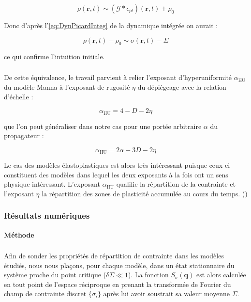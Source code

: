 \begin{equation}
	\rho (\mathbf{r},t) \sim \left(\mathcal{G}\ast\epsilon_{pl}\right)(\mathbf{r},t)+ \rho_0
\end{equation}

\noindent Donc d'après l'\autoref{eq:DynPicardInteg} de la dynamique intégrée on aurait :

\begin{equation}
	\rho (\mathbf{r},t) - \rho_0 \sim \sigma (\mathbf{r},t)- \Sigma
\end{equation}

\noindent ce qui confirme l'intuition initiale.

\subparagraph{}De cette équivalence, le travail \cite{wiese_hyperuniformity_2024} parvient à relier l'exposant d'hyperuniformité $\alpha_\text{HU}$ du modèle Manna à l'exposant de rugosité $\eta$ du dépiégeage avec la relation d'échelle :

\begin{equation}
	\alpha_\text{HU} = 4 - D - 2\eta
\end{equation}

\noindent que l'on peut généraliser dans notre cas pour une portée arbitraire $\alpha$ du propagateur :

\begin{equation}
	\alpha_\text{HU} = 2\alpha - 3D - 2\eta
	\label{eq:scalingHULP}
\end{equation}

\noindent Le cas des modèles élastoplastiques est alors très intéressant puisque ceux-ci constituent des modèles dans lequel les deux exposants à la fois ont un sens physique intéressant. L'exposant $\alpha_\text{HU}$ qualifie la répartition de la contrainte et l'exposant $\eta$ la répartition des zones de plasticité accumulée au cours du temps. ()

\subsubsection{Résultats numériques}

\label{sec:HUEPM}

\paragraph{Méthode}

\subparagraph{}Afin de sonder les propriétés de répartition de contrainte dans les modèles étudiés, nous nous plaçons, pour chaque modèle, dans un état stationnaire du système proche du point critique ($\delta\Sigma \ll 1$). La fonction $S_\sigma(\mathbf{q})$ est alors calculée en tout point de l'espace réciproque en prenant la transformée de Fourier du champ de contrainte discret $\{\sigma_i\}$ après lui avoir soustrait sa valeur moyenne $\Sigma$. 

